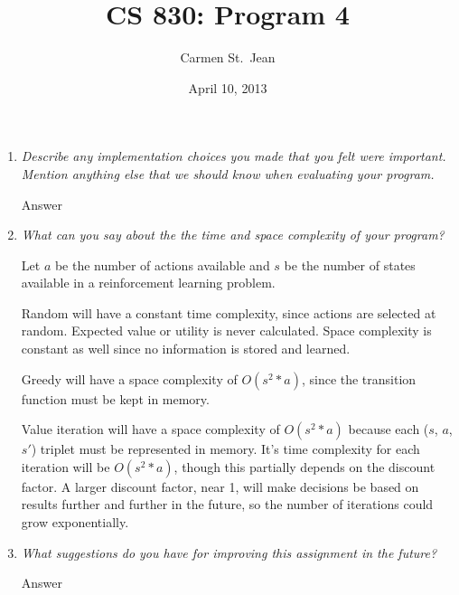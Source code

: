\documentclass[letterpaper,11pt]{article}
\begin{document}
\title{CS 830: Program 4}
\date{April 10, 2013}
\author{Carmen St.\ Jean}

\maketitle

\begin{enumerate}
\item \emph{Describe any implementation choices you made that you felt were important. Mention anything else that we should know when evaluating your program.}

Answer
\item \emph{What can you say about the the time and space complexity of your
program?}

Let $a$ be the number of actions available and $s$ be the number of states available in a reinforcement learning problem.

Random will have a constant time complexity, since actions are selected at random.  Expected value or utility is never calculated.  Space complexity is constant as well since no information is stored and learned.

Greedy will have a space complexity of $O(s^2 * a)$, since the transition function must be kept in memory.

Value iteration will have a space complexity of $O(s^2 * a)$ because each ($s$, $a$, $s'$) triplet must be represented in memory.  It's time complexity for each iteration will be $O(s^2 * a)$, though this partially depends on the discount factor.  A larger discount factor, near 1, will make decisions be based on results further and further in the future, so the number of iterations could grow exponentially.


\item \emph{What suggestions do you have for improving this assignment in the future?}

Answer
\end{enumerate}
\end{document}
